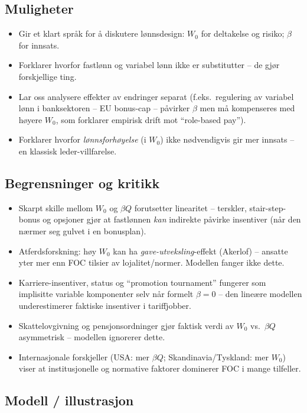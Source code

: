 \subsection*{Muligheter}
\begin{itemize}\setlength{\itemsep}{1pt}
\item Gir et klart språk for å diskutere lønnsdesign: $W_0$ for deltakelse og risiko; $\beta$ for innsats.
\item Forklarer hvorfor fastlønn og variabel lønn ikke er substitutter -- de gjør forskjellige ting.
\item Lar oss analysere effekter av endringer separat (f.eks.\ regulering av variabel lønn i banksektoren -- EU bonus-cap -- påvirker $\beta$ men må kompenseres med høyere $W_0$, som forklarer empirisk drift mot ``role-based pay'').
\item Forklarer hvorfor \emph{lønnsforhøyelse} (i $W_0$) ikke nødvendigvis gir mer innsats -- en klassisk leder-villfarelse.
\end{itemize}

\subsection*{Begrensninger og kritikk}
\begin{itemize}\setlength{\itemsep}{1pt}
\item Skarpt skille mellom $W_0$ og $\beta Q$ forutsetter linearitet -- terskler, stair-step-bonus og opsjoner gjør at fastlønnen \emph{kan} indirekte påvirke insentiver (når den nærmer seg gulvet i en bonusplan).
\item Atferdsforskning: høy $W_0$ kan ha \emph{gave-utveksling}-effekt (Akerlof) -- ansatte yter mer enn FOC tilsier av lojalitet/normer. Modellen fanger ikke dette.
\item Karriere-insentiver, status og ``promotion tournament'' fungerer som implisitte variable komponenter selv når formelt $\beta=0$ -- den lineære modellen underestimerer faktiske insentiver i tariffjobber.
\item Skattelovgivning og pensjonsordninger gjør faktisk verdi av $W_0$ vs.\ $\beta Q$ asymmetrisk -- modellen ignorerer dette.
\item Internasjonale forskjeller (USA: mer $\beta Q$; Skandinavia/Tyskland: mer $W_0$) viser at institusjonelle og normative faktorer dominerer FOC i mange tilfeller.
\end{itemize}

\subsection*{Modell / illustrasjon}

